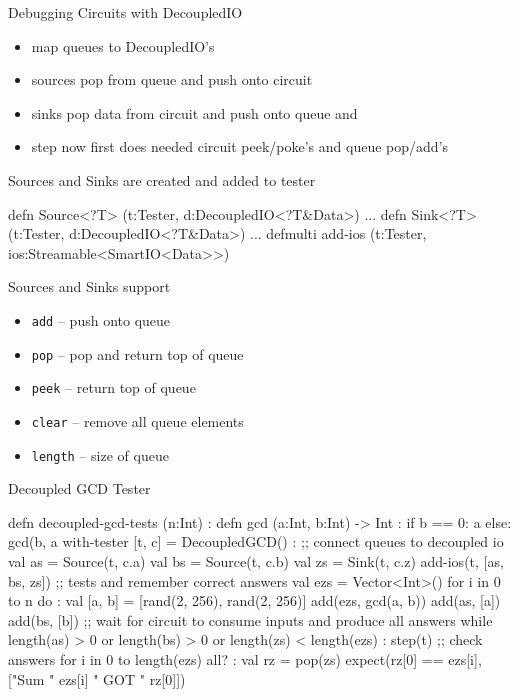 \documentclass[xcolor=pdflatex,dvipsnames,table]{beamer}
\begin{document}
\begin{frame}[fragile]{Debugging Circuits with DecoupledIO}

\begin{itemize}
\item map queues to DecoupledIO's
\item sources pop from queue and push onto circuit  
\item sinks pop data from circuit and push onto queue and 
\item step now first does needed circuit peek/poke's and queue pop/add's
\end{itemize}    

Sources and Sinks are created and added to tester
\begin{scala}
defn Source<?T> (t:Tester, d:DecoupledIO<?T&Data>) ...
defn Sink<?T> (t:Tester, d:DecoupledIO<?T&Data>) ...
defmulti add-ios (t:Tester, ios:Streamable<SmartIO<Data>>) 
\end{scala}    

Sources and Sinks support
\begin{itemize}
\item \verb+add+ -- push onto queue 
\item \verb+pop+ -- pop and return top of queue
\item \verb+peek+ -- return top of queue
\item \verb+clear+ -- remove all queue elements
\item \verb+length+ -- size of queue
\end{itemize}    

\end{frame}

\begin{frame}[fragile]{Decoupled GCD Tester}

{
\begin{stanza}
defn decoupled-gcd-tests (n:Int) :
  defn gcd (a:Int, b:Int) -> Int :
    if b == 0: a else: gcd(b, a %
  with-tester [t, c] = DecoupledGCD() :
    ;; connect queues to decoupled io
    val as = Source(t, c.a)
    val bs = Source(t, c.b)
    val zs = Sink(t, c.z)
    add-ios(t, [as, bs, zs])
    ;; tests and remember correct answers
    val ezs = Vector<Int>()
    for i in 0 to n do :
      val [a, b] = [rand(2, 256), rand(2, 256)]
      add(ezs, gcd(a, b))
      add(as, [a])
      add(bs, [b])
    ;; wait for circuit to consume inputs and produce all answers
    while length(as) > 0 or length(bs) > 0 or length(zs) < length(ezs) :
      step(t)
    ;; check answers
    for i in 0 to length(ezs) all? :
      val rz = pop(zs)
      expect(rz[0] == ezs[i], ["Sum " ezs[i] " GOT " rz[0]])
\end{stanza}
}

\end{frame}
\end{document}
